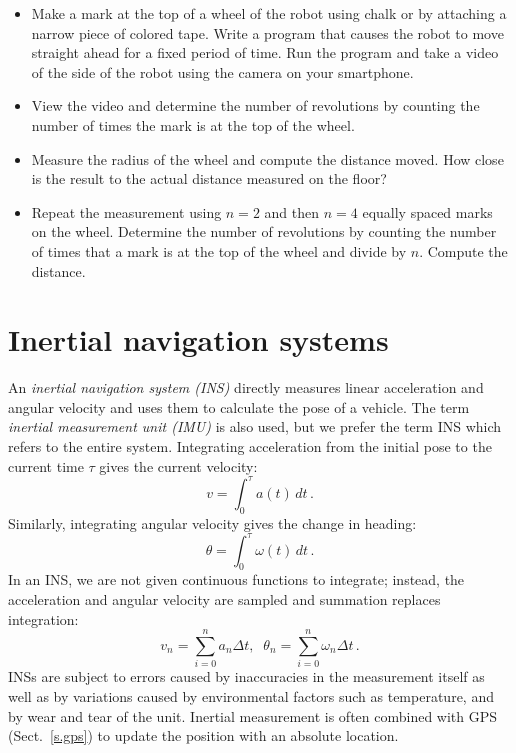 \begin{framed}
\begin{itemize}
\item Make a mark at the top of a wheel of the robot using chalk or by attaching a narrow piece of colored tape. Write a program that causes the robot to move straight ahead for a fixed period of time. Run the program and take a video of the side of the robot using the camera on your smartphone.
\item View the video and determine the number of revolutions by counting the number of times the mark is at the top of the wheel.
\item Measure the radius of the wheel and compute the distance moved. How close is the result to the actual distance measured on the floor?
\item Repeat the measurement using $n=2$ and then $n=4$ equally spaced marks on the wheel. Determine the number of revolutions by counting the number of times that a mark is at the top of the wheel and divide by $n$. Compute the distance.
\end{itemize}
\end{framed}

\section{Inertial navigation systems}\label{s.imu}

An \emph{inertial navigation system (INS)} directly measures linear acceleration and angular velocity and uses them to calculate the pose of a vehicle. The term \emph{inertial measurement unit (IMU)} is also used, but we prefer the term INS which refers to the entire system. Integrating acceleration from the initial pose to the current time $\tau$ gives the current velocity:
\[
v=\int_0^\tau a(t) \,dt\,.
\]
Similarly, integrating angular velocity gives the change in heading:
\[
\theta = \int_0^\tau \omega(t) \, dt\,.
\]
In an INS, we are not given continuous functions to integrate; instead, the acceleration and angular velocity are sampled and summation replaces integration:
\[
v_n = \sum^{n}_{i=0} a_n \Delta t,\;\; \theta_n = \sum^{n}_{i=0} \omega_n \Delta t\,.
\]
INSs are subject to errors caused by inaccuracies in the measurement itself as well as by variations caused by environmental factors such as temperature, and by wear and tear of the unit. Inertial measurement is often combined with GPS (Sect.~\ref{s.gps}) to update the position with an absolute location.

